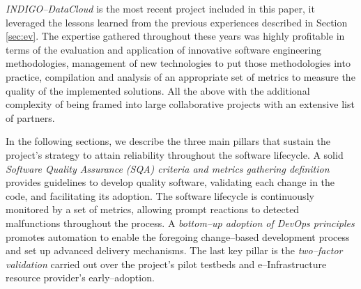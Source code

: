 \documentclass[journal]{IEEEtran}
\begin{document}
{\sl INDIGO--DataCloud} is the most recent project included in this paper, it
leveraged the lessons learned from the previous experiences described in
Section \ref{sec:ev}. The expertise gathered throughout these years was highly
profitable in terms of the evaluation and application of innovative software engineering
methodologies, management of new technologies to put those methodologies
into practice, compilation and analysis of an appropriate set of metrics to measure the
quality of the implemented solutions. All the above with the additional complexity of being framed into
large collaborative projects with an extensive list of partners.

In the following sections, we describe the three main pillars that sustain the project's strategy to attain reliability throughout the
software lifecycle. A solid \textit{Software Quality Assurance (SQA) criteria
and metrics gathering definition} provides guidelines to develop quality
software, validating each change in the code, and facilitating its adoption. The software lifecycle is continuously monitored
by a set of metrics, allowing prompt reactions to detected malfunctions throughout the
process. A \textit{bottom--up adoption of DevOps principles} promotes automation to enable
the foregoing change--based development process and set up advanced delivery mechanisms.
The last key pillar is the \textit{two--factor validation} carried out over the project's pilot testbeds and
e--Infrastructure resource provider's early--adoption.


\end{document}
